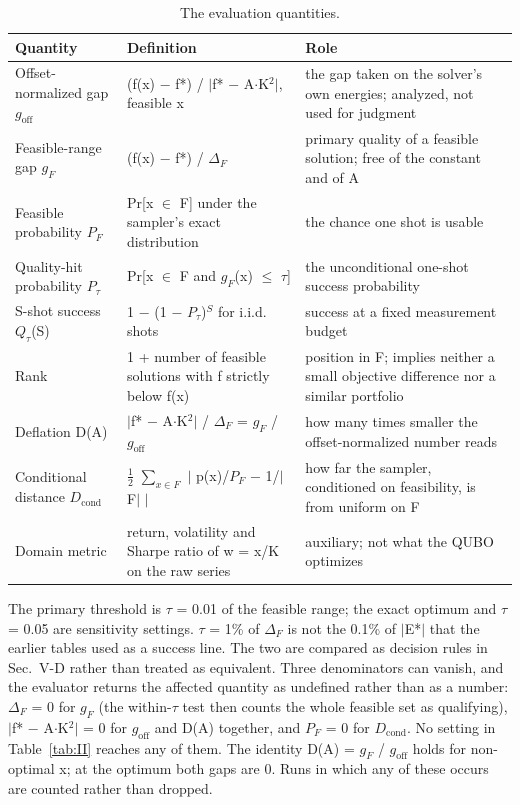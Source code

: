 \documentclass{ieeeaccess}
\begin{document}
\begin{table}[!t]
\centering
\scriptsize
\caption{The evaluation quantities.}
\label{tab:I}
\begin{tabular}{p{}p{}p{}}
\toprule
Quantity & Definition & Role \\
\midrule
Offset-normalized gap $g_{\mathrm{off}}$ & (f(x) $-$ f*) / $|$f* $-$ A$\cdot$K$^{2}$$|$, feasible x & the gap taken on the solver's own energies; analyzed, not used for judgment \\
Feasible-range gap $g_{F}$ & (f(x) $-$ f*) / $\Delta_{F}$ & primary quality of a feasible solution; free of the constant and of A \\
Feasible probability $P_{F}$ & Pr[x $\in$ F] under the sampler's exact distribution & the chance one shot is usable \\
Quality-hit probability $P_{\tau}$ & Pr[x $\in$ F and $g_{F}$(x) $\leq$ $\tau$] & the unconditional one-shot success probability \\
S-shot success $Q_{\tau}$(S) & 1 $-$ (1 $-$ $P_{\tau}$)$^{S}$ for i.i.d. shots & success at a fixed measurement budget \\
Rank & 1 + number of feasible solutions with f strictly below f(x) & position in F; implies neither a small objective difference nor a similar portfolio \\
Deflation D(A) & $|$f* $-$ A$\cdot$K$^{2}$$|$ / $\Delta_{F}$ = $g_{F}$ / $g_{\mathrm{off}}$ & how many times smaller the offset-normalized number reads \\
Conditional distance $D_{\mathrm{cond}}$ & $\tfrac{1}{2}$ $\sum_{x\in F}$ $|$ p(x)/$P_{F}$ $-$ 1/$|$F$|$ $|$ & how far the sampler, conditioned on feasibility, is from uniform on F \\
Domain metric & return, volatility and Sharpe ratio of w = x/K on the raw series & auxiliary; not what the QUBO optimizes \\
\bottomrule
\end{tabular}
\end{table}


The primary threshold is $\tau$ = 0.01 of the feasible range; the exact optimum and $\tau$ = 0.05 are sensitivity settings. $\tau$ = 1\% of $\Delta_{F}$ is not the 0.1\% of $|$E*$|$ that the earlier tables used as a success line. The two are compared as decision rules in Sec.~V-D rather than treated as equivalent. Three denominators can vanish, and the evaluator returns the affected quantity as undefined rather than as a number: $\Delta_{F}$ = 0 for $g_{F}$ (the within-$\tau$ test then counts the whole feasible set as qualifying), $|$f* $-$ A$\cdot$K$^{2}$$|$ = 0 for $g_{\mathrm{off}}$ and D(A) together, and $P_{F}$ = 0 for $D_{\mathrm{cond}}$. No setting in Table~\ref{tab:II} reaches any of them. The identity D(A) = $g_{F}$ / $g_{\mathrm{off}}$ holds for non-optimal x; at the optimum both gaps are 0. Runs in which any of these occurs are counted rather than dropped.
\end{document}
